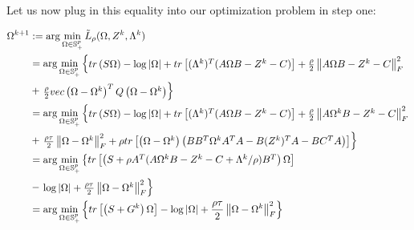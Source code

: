 \documentclass[11pt,]{report}
\begin{document}
Let us now plug in this equality into our optimization problem in step one:

\begin{equation}
\begin{split}
  \Omega^{k + 1} &:= \arg\min_{\Omega \in \mathbb{S}_{+}^{p}}\tilde{L}_{\rho}(\Omega, Z^{k}, \Lambda^{k}) \\
  &= \arg\min_{\Omega \in \mathbb{S}_{+}^{p}}\left\{\begin{matrix}
 tr\left(S\Omega\right) - \log\left|\Omega\right| + tr\left[(\Lambda^{k})^{T}(A\Omega B - Z^{k} - C) \right] + \frac{\rho}{2}\left\|A\Omega B - Z^{k} - C \right\|_{F}^{2} \end{matrix}\right. \\
  &+ \left.\begin{matrix} \frac{\rho}{2}vec\left(\Omega - \Omega^{k}\right)^{T}Q\left(\Omega - \Omega^{k}\right) \end{matrix}\right\} \\
  &= \arg\min_{\Omega \in \mathbb{S}_{+}^{p}}\left\{\begin{matrix}
 tr\left(S\Omega\right) - \log\left|\Omega\right| + tr\left[(\Lambda^{k})^{T}(A\Omega B - Z^{k} - C) \right] + \frac{\rho}{2}\left\|A\Omega^{k} B - Z^{k} - C \right\|_{F}^{2} \end{matrix}\right. \\
  &+ \left.\begin{matrix} \frac{\rho\tau}{2}\left\|\Omega - \Omega^{k}\right\|_{F}^{2} + \rho tr\left[\left(\Omega - \Omega^{k}\right)\left(BB^{T}\Omega^{k}A^{T}A - B(Z^{k})^{T}A - BC^{T}A \right)\right] \end{matrix}\right\} \\
  &= \arg\min_{\Omega \in \mathbb{S}_{+}^{p}}\left\{\begin{matrix}
 tr\left[\left(S + \rho A^{T}(A\Omega^{k}B - Z^{k} - C + \Lambda^{k}/\rho)B^{T} \right)\Omega\right] \end{matrix}\right. \\
  &- \left.\begin{matrix} \log\left|\Omega\right| + \frac{\rho\tau}{2}\left\|\Omega - \Omega^{k}\right\|_{F}^{2} \end{matrix}\right\} \\
  &= \arg\min_{\Omega \in \mathbb{S}_{+}^{p}}\left\{
 tr\left[\left(S + G^{k} \right)\Omega\right] - \log\left|\Omega\right| + \frac{\rho\tau}{2}\left\|\Omega - \Omega^{k}\right\|_{F}^{2} \right\} \\
\label{eq:omegaapprox}\notag
\end{split}
\end{equation}
\end{document}
